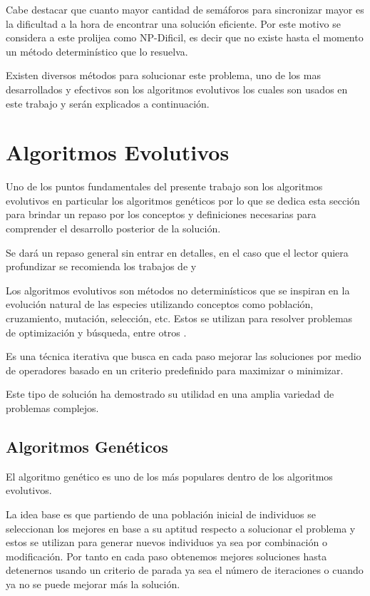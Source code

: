 Cabe destacar que cuanto mayor cantidad de semáforos para sincronizar mayor es la dificultad a la hora de encontrar una solución eficiente. Por este motivo se considera a este prolijea como NP-Dificil, es decir que no existe hasta el momento un método determinístico que lo resuelva.

Existen diversos métodos para solucionar este problema, uno de los mas desarrollados y efectivos son los algoritmos evolutivos los cuales son usados en este trabajo y serán explicados a continuación.

\section{Algoritmos Evolutivos}

Uno de los puntos fundamentales del presente trabajo son los algoritmos evolutivos en particular los algoritmos genéticos por lo que se dedica esta sección para  brindar un repaso por los conceptos y definiciones necesarias para comprender el desarrollo posterior de la solución.

Se dará un repaso general sin entrar en detalles, en el caso que el lector quiera profundizar se recomienda los trabajos de \citet{Goldberg1989} y \citet{Mitchell1996}

Los algoritmos evolutivos son métodos no determinísticos que se inspiran en la evolución natural de las especies utilizando conceptos como población, cruzamiento, mutación, selección, etc. Estos se utilizan para resolver problemas de optimización y búsqueda, entre otros \citep{Nesmachnow2002}.

Es una técnica iterativa que busca en cada paso mejorar las soluciones por medio de operadores basado en un criterio predefinido para maximizar o minimizar.

Este tipo de solución ha demostrado su utilidad en una amplia variedad de problemas complejos.


\subsection{Algoritmos Genéticos}
El algoritmo genético es uno de los más populares dentro de los algoritmos evolutivos.

La idea base es que partiendo de una población inicial de individuos se seleccionan los mejores en base a su aptitud respecto a solucionar el problema y estos se utilizan para generar nuevos individuos ya sea por combinación o modificación. Por tanto en cada paso obtenemos mejores soluciones hasta detenernos usando un criterio de parada ya sea el número de iteraciones o cuando ya no se puede mejorar más la solución.

